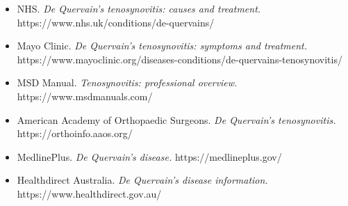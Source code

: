 \begin{itemize}
    \item NHS. \textit{De Quervain's tenosynovitis: causes and treatment.} https://www.nhs.uk/conditions/de-quervains/
    \item Mayo Clinic. \textit{De Quervain's tenosynovitis: symptoms and treatment.} https://www.mayoclinic.org/diseases-conditions/de-quervains-tenosynovitis/
    \item MSD Manual. \textit{Tenosynovitis: professional overview.} https://www.msdmanuals.com/
    \item American Academy of Orthopaedic Surgeons. \textit{De Quervain's tenosynovitis.} https://orthoinfo.aaos.org/
    \item MedlinePlus. \textit{De Quervain's disease.} https://medlineplus.gov/
    \item Healthdirect Australia. \textit{De Quervain's disease information.} https://www.healthdirect.gov.au/
\end{itemize}

